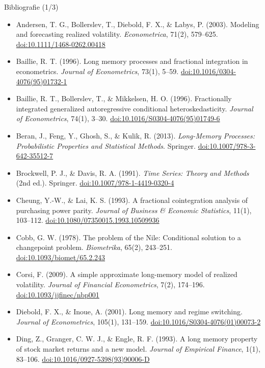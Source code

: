 \begin{frame}{Bibliografie (1/3)}
\itemsize{\scriptsize}
\begin{itemize}
    \item Andersen, T. G., Bollerslev, T., Diebold, F. X., \& Labys, P. (2003). Modeling and forecasting realized volatility. \textit{Econometrica}, 71(2), 579--625. \href{https://doi.org/10.1111/1468-0262.00418}{doi:10.1111/1468-0262.00418}
    \item Baillie, R. T. (1996). Long memory processes and fractional integration in econometrics. \textit{Journal of Econometrics}, 73(1), 5--59. \href{https://doi.org/10.1016/0304-4076(95)01732-1}{doi:10.1016/0304-4076(95)01732-1}
    \item Baillie, R. T., Bollerslev, T., \& Mikkelsen, H. O. (1996). Fractionally integrated generalized autoregressive conditional heteroskedasticity. \textit{Journal of Econometrics}, 74(1), 3--30. \href{https://doi.org/10.1016/S0304-4076(95)01749-6}{doi:10.1016/S0304-4076(95)01749-6}
    \item Beran, J., Feng, Y., Ghosh, S., \& Kulik, R. (2013). \textit{Long-Memory Processes: Probabilistic Properties and Statistical Methods}. Springer. \href{https://doi.org/10.1007/978-3-642-35512-7}{doi:10.1007/978-3-642-35512-7}
    \item Brockwell, P. J., \& Davis, R. A. (1991). \textit{Time Series: Theory and Methods} (2nd ed.). Springer. \href{https://doi.org/10.1007/978-1-4419-0320-4}{doi:10.1007/978-1-4419-0320-4}
    \item Cheung, Y.-W., \& Lai, K. S. (1993). A fractional cointegration analysis of purchasing power parity. \textit{Journal of Business \& Economic Statistics}, 11(1), 103--112. \href{https://doi.org/10.1080/07350015.1993.10509936}{doi:10.1080/07350015.1993.10509936}
    \item Cobb, G. W. (1978). The problem of the Nile: Conditional solution to a changepoint problem. \textit{Biometrika}, 65(2), 243--251. \href{https://doi.org/10.1093/biomet/65.2.243}{doi:10.1093/biomet/65.2.243}
    \item Corsi, F. (2009). A simple approximate long-memory model of realized volatility. \textit{Journal of Financial Econometrics}, 7(2), 174--196. \href{https://doi.org/10.1093/jjfinec/nbp001}{doi:10.1093/jjfinec/nbp001}
    \item Diebold, F. X., \& Inoue, A. (2001). Long memory and regime switching. \textit{Journal of Econometrics}, 105(1), 131--159. \href{https://doi.org/10.1016/S0304-4076(01)00073-2}{doi:10.1016/S0304-4076(01)00073-2}
    \item Ding, Z., Granger, C. W. J., \& Engle, R. F. (1993). A long memory property of stock market returns and a new model. \textit{Journal of Empirical Finance}, 1(1), 83--106. \href{https://doi.org/10.1016/0927-5398(93)90006-D}{doi:10.1016/0927-5398(93)90006-D}
\end{itemize}
\end{frame}

